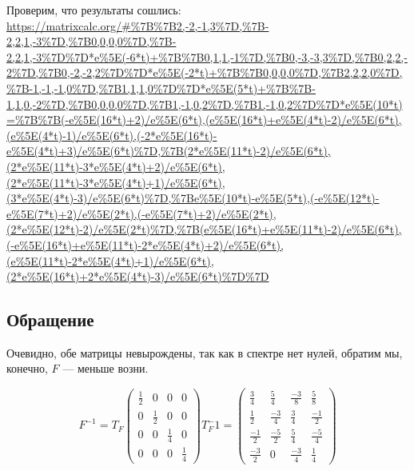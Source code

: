 \documentclass[12pt, a4paper]{article}
\begin{document}
    Проверим, что результаты сошлись:
    \url{https://matrixcalc.org/#%7B%7B2,-2,-1,3%7D,%7B-2,2,1,-3%7D,%7B0,0,0,0%7D,%7B-2,2,1,-3%7D%7D*e%5E(-6*t)+%7B%7B0,1,1,-1%7D,%7B0,-3,-3,3%7D,%7B0,2,2,-2%7D,%7B0,-2,-2,2%7D%7D*e%5E(-2*t)+%7B%7B0,0,0,0%7D,%7B2,2,2,0%7D,%7B-1,-1,-1,0%7D,%7B1,1,1,0%7D%7D*e%5E(5*t)+%7B%7B-1,1,0,-2%7D,%7B0,0,0,0%7D,%7B1,-1,0,2%7D,%7B1,-1,0,2%7D%7D*e%5E(10*t)=%7B%7B(-e%5E(16*t)+2)/e%5E(6*t),(e%5E(16*t)+e%5E(4*t)-2)/e%5E(6*t),(e%5E(4*t)-1)/e%5E(6*t),(-2*e%5E(16*t)-e%5E(4*t)+3)/e%5E(6*t)%7D,%7B(2*e%5E(11*t)-2)/e%5E(6*t),(2*e%5E(11*t)-3*e%5E(4*t)+2)/e%5E(6*t),(2*e%5E(11*t)-3*e%5E(4*t)+1)/e%5E(6*t),(3*e%5E(4*t)-3)/e%5E(6*t)%7D,%7Be%5E(10*t)-e%5E(5*t),(-e%5E(12*t)-e%5E(7*t)+2)/e%5E(2*t),(-e%5E(7*t)+2)/e%5E(2*t),(2*e%5E(12*t)-2)/e%5E(2*t)%7D,%7B(e%5E(16*t)+e%5E(11*t)-2)/e%5E(6*t),(-e%5E(16*t)+e%5E(11*t)-2*e%5E(4*t)+2)/e%5E(6*t),(e%5E(11*t)-2*e%5E(4*t)+1)/e%5E(6*t),(2*e%5E(16*t)+2*e%5E(4*t)-3)/e%5E(6*t)%7D%7D}


    \subsection{Обращение}


    Очевидно, обе матрицы невырождены, так как в спектре нет нулей, обратим мы, конечно, $F$ — меньше возни.

    \begin{equation}
        F^{-1} = T_F \left(\begin{matrix}
            \frac12 & 0 & 0 & 0 \\
            0 & \frac12 & 0 & 0 \\
            0 & 0 & \frac14 & 0 \\
            0 & 0 & 0 & \frac14
        \end{matrix}\right) T_F^-1 = \left(\begin{matrix}
            \frac{3}{4} & \frac{5}{4} & \frac{-3}{8} & \frac{5}{8} \\
            \frac{1}{2} & \frac{-3}{4} & \frac{3}{4} & \frac{-1}{2} \\
            \frac{-1}{2} & \frac{-5}{2} & \frac{5}{4} & \frac{-5}{4} \\
            \frac{-3}{2} & 0 & \frac{-3}{4} & \frac{1}{4}
        \end{matrix}\right)
    \end{equation}
 
\end{document}

